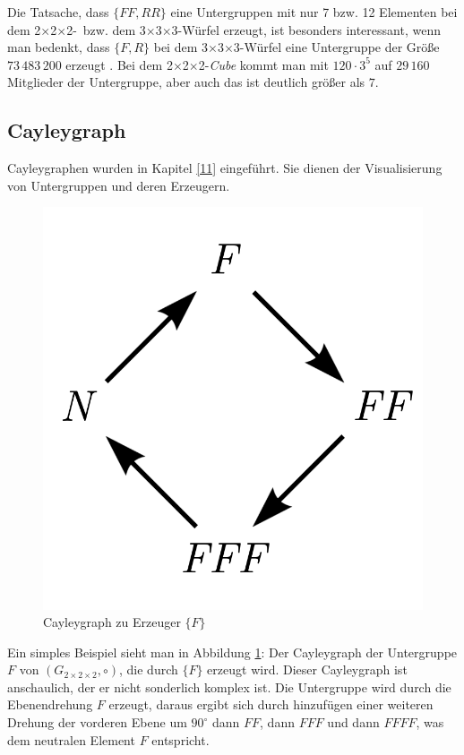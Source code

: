 \documentclass[12pt,a4paper, usenames, dvipsnames]{article}
\newcommand{\Gtwo}{\ensuremath{G_{2\times 2\times 2}}}
\newcommand{\Ttwo}{2$\times$2$\times$2-}
\newcommand{\Tthree}{3$\times$3$\times$3-}
\begin{document}
Die Tatsache, dass $\{ FF, RR \}$ eine Untergruppen mit nur 7 bzw. 12 Elementen bei dem \Ttwo \  bzw. dem \Tthree Würfel erzeugt, ist besonders interessant, wenn man bedenkt, dass $\{ F, R \}$ bei dem  \Tthree Würfel eine Untergruppe der Größe $73\, 483\, 200$ erzeugt \cite{TD}. 
Bei dem \Ttwo \textit{Cube} kommt man mit $120 \cdot 3^5$ auf $29 \, 160$ Mitglieder der Untergruppe, aber auch das ist deutlich größer als $7$.

%
%
%
%
%
%
%
%
%
%
%
%
%
%
%
%
\subsection*{Cayleygraph}
Cayleygraphen wurden in Kapitel \ref{11} eingeführt. Sie dienen der Visualisierung von Untergruppen und deren Erzeugern.

\begin{figure}[h]
\centering
\includegraphics[scale=0.7]{Cayleygraph1.png}
\caption{Cayleygraph zu Erzeuger $\{ F \}$}
\label{27}
\end{figure}

Ein simples Beispiel sieht man in Abbildung \ref{27}: Der Cayleygraph der Untergruppe $F$ von $(\Gtwo, \circ)$, die durch $\{ F \}$  erzeugt wird.
Dieser Cayleygraph ist anschaulich, der er nicht sonderlich komplex ist.
Die Untergruppe wird durch die Ebenendrehung $F$ erzeugt, daraus ergibt sich durch hinzufügen einer weiteren Drehung der vorderen Ebene um $90^\circ$ dann $FF$, dann $FFF$ und dann $FFFF$, was dem neutralen Element $F$ entspricht.
\end{document}
